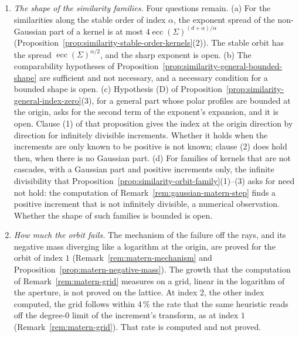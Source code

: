 \begin{enumerate}
\item \emph{The shape of the similarity families.}\label{prob:similarity-shape} Four questions remain.
(a) For the similarities along the stable order of index $\alpha$, the exponent spread of the
non-Gaussian part of a kernel is at most $4\operatorname{ecc}(\Sigma)^{(d+\alpha)/\alpha}$
(Proposition~\ref{prop:similarity-stable-order-kernels}(2)). The stable orbit has the spread
$\operatorname{ecc}(\Sigma)^{\alpha/2}$, and the sharp exponent is open.
(b) The comparability hypotheses of Proposition~\ref{prop:similarity-general-bounded-shape} are
sufficient and not necessary, and a necessary condition for a bounded shape is open.
(c) Hypothesis (D) of Proposition~\ref{prop:similarity-general-index-zero}(3), for a general part
whose polar profiles are bounded at the origin, asks for the second term of the exponent's
expansion, and it is open. Clause (1) of that proposition gives the index at the origin direction by
direction for infinitely divisible increments. Whether it holds when the increments are only known to
be positive is not known; clause (2) does hold then, when there is no Gaussian part.
(d) For families of kernels that are not cascades, with a Gaussian part and positive increments
only, the infinite divisibility that Proposition~\ref{prop:similarity-orbit-family}(1)--(3) asks
for need not hold: the computation of Remark~\ref{rem:gaussian-matern-step} finds a positive
increment that is not infinitely divisible, a numerical observation. Whether
the shape of such families is bounded is open.

\item \emph{How much the \Matern{} orbit fails.} The mechanism of the failure off the rays, and its
negative mass diverging like a logarithm at the origin, are proved for the \Matern{} orbit of
index $1$ (Remark~\ref{rem:matern-mechanism} and Proposition~\ref{prop:matern-negative-mass}). The
growth that the computation of Remark~\ref{rem:matern-grid} measures on a grid, linear in the
logarithm of the aperture, is not proved on the lattice.
At index $2$, the other index computed, the grid follows within 4\,\% the rate that the same
heuristic reads off the degree-$0$ limit of the increment's transform, as at index $1$
(Remark~\ref{rem:matern-grid}). That rate is computed and not proved.


\end{enumerate}
